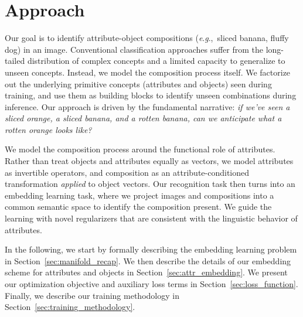 \documentclass[runningheads]{llncs}
\newcommand{\eg}{\textit{e}.\textit{g}.,~}
\newcommand{\refsec}[1]{Section~\ref{#1}}
\begin{document}
\section{Approach}

Our goal is to identify attribute-object compositions (\eg sliced banana, fluffy dog) in an image.  
Conventional classification approaches suffer from the long-tailed distribution of complex concepts \cite{sadeghi2011recognition,lu2016visual} and a limited capacity to generalize to unseen concepts.  
Instead, we model the composition process itself. We factorize out the underlying primitive concepts (attributes and objects) seen during training, and use them as building blocks to identify unseen combinations  during inference. Our approach is driven by the fundamental narrative: \emph{if we've seen a sliced orange, a sliced banana, and a rotten banana, can we anticipate what a rotten orange looks like?}

We model the composition process around the functional role of attributes. Rather than treat objects and attributes equally as vectors, we model attributes as invertible operators, and composition as an attribute-conditioned transformation \emph{applied} to object vectors.
Our recognition task then turns into an embedding learning task, where we project images and compositions into a common semantic space to identify the composition present. We guide the learning with novel regularizers that are consistent with the linguistic behavior of attributes.


In the following, we start by formally describing the embedding learning problem in \refsec{sec:manifold_recap}. 
We then describe the details of our embedding scheme for attributes and objects in \refsec{sec:attr_embedding}.
We present our optimization objective and auxiliary loss terms in \refsec{sec:loss_function}. Finally, we describe our training methodology in \refsec{sec:training_methodology}.
\end{document}
